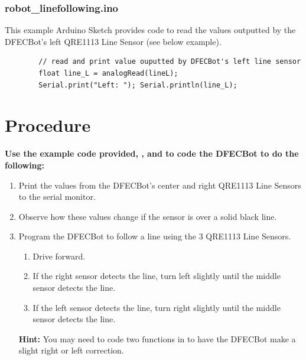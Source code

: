 \documentclass{handout}
\begin{document}
	\subsubsection{robot\_linefollowing.ino}
	This example Arduino Sketch provides code to read the values outputted by the DFECBot's left QRE1113 Line Sensor (see below example).
	
	\begin{lstlisting}
		// read and print value ouputted by DFECBot's left line sensor
		float line_L = analogRead(lineL);
		Serial.print("Left: "); Serial.println(line_L);
	\end{lstlisting}
	
	\newpage
	\clearpage
	\pagebreak
	
	\section{Procedure}
	\textbf{Use the example code provided, , and  to code the DFECBot to do the following:}
		
	\begin{enumerate}
		\item Print the values from the DFECBot's center and right QRE1113 Line Sensors to the serial monitor.
		\item Observe how these values change if the sensor is over a solid black line.
		\item Program the DFECBot to follow a line using the 3 QRE1113 Line Sensors.
			\begin{enumerate}
				\item Drive forward.
				\item If the right sensor detects the line, turn left slightly until the middle sensor detects the line.
				\item If the left sensor detects the line, turn right slightly until the middle sensor detects the line.
			\end{enumerate}
		
			\textbf{Hint:} You may need to code two functions in  to have the DFECBot make a slight right or left correction.
	\end{enumerate} 	
\end{document}
